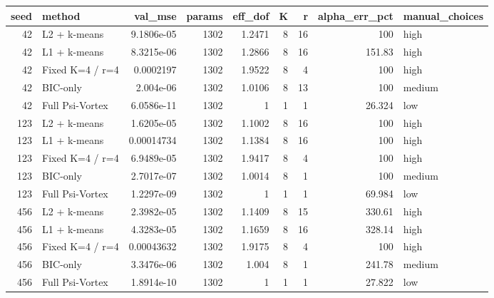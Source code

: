 \begin{tabular}{rlrrrrrrl}
\toprule
seed & method & val_mse & params & eff_dof & K & r & alpha_err_pct & manual_choices \\
\midrule
42 & L2 + k-means & 9.1806e-05 & 1302 & 1.2471 & 8 & 16 & 100 & high \\
42 & L1 + k-means & 8.3215e-06 & 1302 & 1.2866 & 8 & 16 & 151.83 & high \\
42 & Fixed K=4 / r=4 & 0.0002197 & 1302 & 1.9522 & 8 & 4 & 100 & high \\
42 & BIC-only & 2.004e-06 & 1302 & 1.0106 & 8 & 13 & 100 & medium \\
42 & Full Psi-Vortex & 6.0586e-11 & 1302 & 1 & 1 & 1 & 26.324 & low \\
123 & L2 + k-means & 1.6205e-05 & 1302 & 1.1002 & 8 & 16 & 100 & high \\
123 & L1 + k-means & 0.00014734 & 1302 & 1.1384 & 8 & 16 & 100 & high \\
123 & Fixed K=4 / r=4 & 6.9489e-05 & 1302 & 1.9417 & 8 & 4 & 100 & high \\
123 & BIC-only & 2.7017e-07 & 1302 & 1.0014 & 8 & 1 & 100 & medium \\
123 & Full Psi-Vortex & 1.2297e-09 & 1302 & 1 & 1 & 1 & 69.984 & low \\
456 & L2 + k-means & 2.3982e-05 & 1302 & 1.1409 & 8 & 15 & 330.61 & high \\
456 & L1 + k-means & 4.3283e-05 & 1302 & 1.1659 & 8 & 16 & 328.14 & high \\
456 & Fixed K=4 / r=4 & 0.00043632 & 1302 & 1.9175 & 8 & 4 & 100 & high \\
456 & BIC-only & 3.3476e-06 & 1302 & 1.004 & 8 & 1 & 241.78 & medium \\
456 & Full Psi-Vortex & 1.8914e-10 & 1302 & 1 & 1 & 1 & 27.822 & low \\
\bottomrule
\end{tabular}

